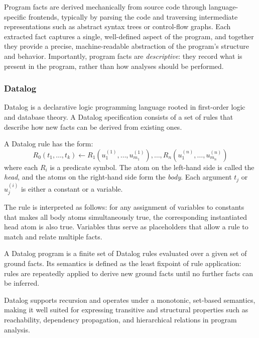Program facts are derived mechanically from source code through language-specific frontends, typically by parsing the code and traversing intermediate representations such as abstract syntax trees or control-flow graphs. Each extracted fact captures a single, well-defined aspect of the program, and together they provide a precise, machine-readable abstraction of the program’s structure and behavior. Importantly, program facts are \emph{descriptive}: they record what is present in the program, rather than how analyses should be performed.


\subsubsection{Datalog}

Datalog is a declarative logic programming language rooted in first-order logic and database theory. A Datalog specification consists of a set of rules that describe how new facts can be derived from existing ones.

\begin{definition}
A Datalog rule has the form:
\begin{equation}
    R_0(t_1, \dots, t_k) \leftarrow R_1(u_1^{(1)}, \dots, u_{m_1}^{(1)}), \dots, R_n(u_1^{(n)}, \dots, u_{m_n}^{(n)})
\end{equation}
where each $R_i$ is a predicate symbol. The atom on the left-hand side is called the \emph{head}, and the atoms on the right-hand side form the \emph{body}.
Each argument $t_j$ or $u_j^{(i)}$ is either a constant or a variable.
\end{definition}

The rule is interpreted as follows: for any assignment of variables to constants that makes all body atoms simultaneously true, the corresponding instantiated head atom is also true. Variables thus serve as placeholders that allow a rule to match and relate multiple facts.

\begin{definition}
A Datalog program is a finite set of Datalog rules evaluated over a given set of ground facts. Its semantics is defined as the least fixpoint of rule application: rules are repeatedly applied to derive new ground facts until no further facts can be inferred.
\end{definition}

Datalog supports recursion and operates under a monotonic, set-based semantics, making it well suited for expressing transitive and structural properties such as reachability, dependency propagation, and hierarchical relations in program analysis.


